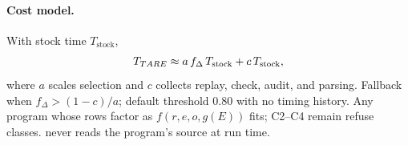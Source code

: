 \paragraph{Cost model.}
With stock time $T_{\mathrm{stock}}$,
\begin{equation}
T_{TARE}\approx a\,f_\Delta\,T_{\mathrm{stock}}+c\,T_{\mathrm{stock}},
\label{eq:cost}
\end{equation}
where $a$ scales selection and $c$ collects replay, check, audit, and parsing.
Fallback when $f_\Delta>(1-c)/a$; default threshold $0.80$ with no timing history.
Any program whose rows factor as $f(r,e,o,g(E))$ fits; C2--C4 remain refuse
classes. \sys never reads the program's source at run time.
